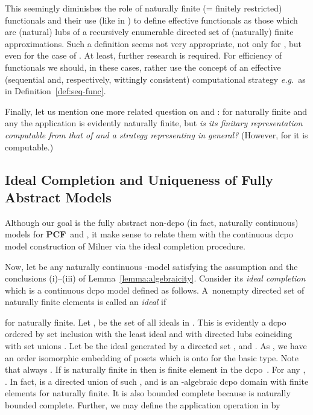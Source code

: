 \documentclass[fleqn]{LMCS}
\theoremstyle{plain}\newtheorem{satz}[thm]{Satz}
\theoremstyle{plain}\newtheorem{hyp}[thm]{Hypothesis}
\theoremstyle{plain}\newtheorem{hyps}[thm]{Hypotheses}
\theoremstyle{definition}\newtheorem{note}[thm]{Note}
\def\eg{{\em e.g.}}
\newcommand{\PCF}{\mbox{\bf PCF}}
\newcommand{\?}{\mbox{?}}
\begin{document}
This seemingly diminishes the role of naturally finite 
(= finitely restricted) functionals and their use 
(like in )
to define effective functionals as those 
which are (natural) lubs of a  recursively enumerable directed set of 
(naturally) finite approximations. 
Such a definition seems not very appropriate, 
not only for , but even for the case of . 
At least, further research is required.
For efficiency of functionals we should, in these cases, rather use the concept 
of an effective (sequential and, respectively, wittingly consistent) computational strategy 
\eg\ as in Definition~\ref{def:seq-func}. 

Finally, let us mention one more related question on  and : 
for naturally finite  and any  the application  is 
evidently naturally finite, but 
\emph{is its finitary representation computable from that of  and a strategy 
representing  in general?} (However, for  it is computable.)


\subsection{Ideal Completion and Uniqueness of Fully Abstract Models}
\label{sec:completion}


\noindent
Although our goal is the fully abstract non-dcpo (in fact, naturally continuous) 
models for \PCF\ and , it make sense 
to relate them with the continuous dcpo model construction of Milner \cite{Milner77} 
via the ideal completion procedure. 

\medskip

Now, let  be any naturally continuous -model 
satisfying the assumption and the conclusions (i)--(iii) 
of Lemma~\ref{lemma:algebraicity}. 
Consider its \emph{ideal completion}  which is 
a continuous dcpo model defined as follows. 
A~nonempty directed set  
of naturally finite elements is called an \emph{ideal} if 
 
for  naturally finite. 
Let , 
be the set of all ideals in . 
This is evidently a dcpo ordered by set inclusion  with 
 the least ideal and with directed 
lubs coinciding with set unions . 
Let 
 be the 
ideal generated by a directed set , and . 
As , 
we have an order isomorphic embedding of posets  which is 
onto for the basic type. Note that always 
. 
If  is naturally finite in  then  is finite
element in the dcpo~. 
For any ,
. In fact,  is a directed union of such , 
and  is an -algebraic dcpo domain with finite elements 
 for  naturally finite. It is also bounded complete because 
 is naturally bounded complete. 
Further, we may define the application operation in  by 
 
\end{document}
